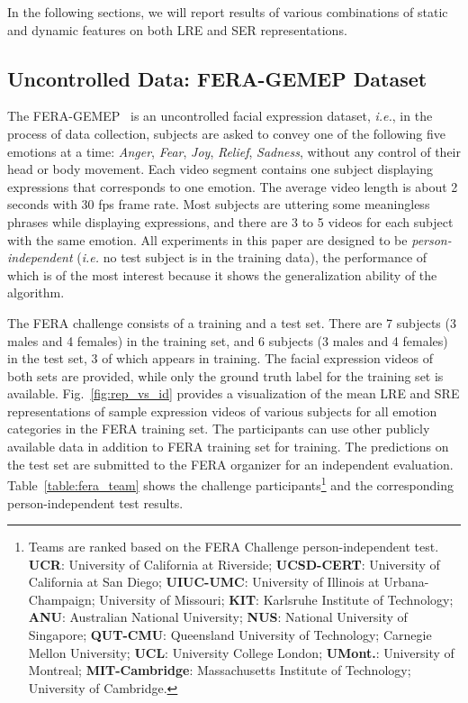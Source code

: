 \documentclass[journal]{IEEEtran}
\begin{document}
In the following sections, we will report results of various combinations of static and dynamic features on both LRE and SER representations. 

\subsection{Uncontrolled Data: FERA-GEMEP Dataset}

The FERA-GEMEP~\cite{FERA_data} is an uncontrolled facial expression dataset, \textit{i.e.}, in the process of data collection, subjects are asked to convey one of the following five emotions at a time: \textit{Anger}, \textit{Fear}, \textit{Joy}, \textit{Relief}, \textit{Sadness}, without any control of their head or body movement. Each video segment contains one subject displaying expressions that corresponds to one emotion. The average video length is about 2 seconds with 30 fps frame rate. Most subjects are uttering some meaningless phrases while displaying expressions, and there are 3 to 5 videos for each subject with the same emotion. All experiments in this paper are designed to be \textit{person-independent} (\textit{i.e.} no test subject is in the training data), the performance of which is of the most interest because it shows the generalization ability of the algorithm. 


The FERA challenge consists of a training and a test set. There are 7 subjects (3 males and 4 females) in the training set, and 6 subjects (3 males and 4 females) in the test set, 3 of which appears in training. The facial expression videos of both sets are provided, while only the ground truth label for the training set is available. Fig.~\ref{fig:rep_vs_id} provides a visualization of the mean LRE and SRE representations of sample expression videos of various subjects for all emotion categories in the FERA training set. The participants can use other publicly available data in addition to FERA training set for training. The predictions on the test set are submitted to the FERA organizer for an independent evaluation. Table~\ref{table:fera_team} shows the challenge participants\footnote{\label{teams}Teams are ranked based on the FERA Challenge person-independent test. \textbf{UCR}: University of California at Riverside; \textbf{UCSD-CERT}: University of California at San Diego; \textbf{UIUC-UMC}: University of Illinois at Urbana-Champaign; University of Missouri; \textbf{KIT}: Karlsruhe Institute of Technology; \textbf{ANU}: Australian National University; \textbf{NUS}: National University of Singapore; \textbf{QUT-CMU}: Queensland University of Technology; Carnegie Mellon University; \textbf{UCL}: University College London; \textbf{UMont.}: University of Montreal;  \textbf{MIT-Cambridge}: Massachusetts Institute of Technology; University of Cambridge.} and the corresponding person-independent test results. 
\end{document}
